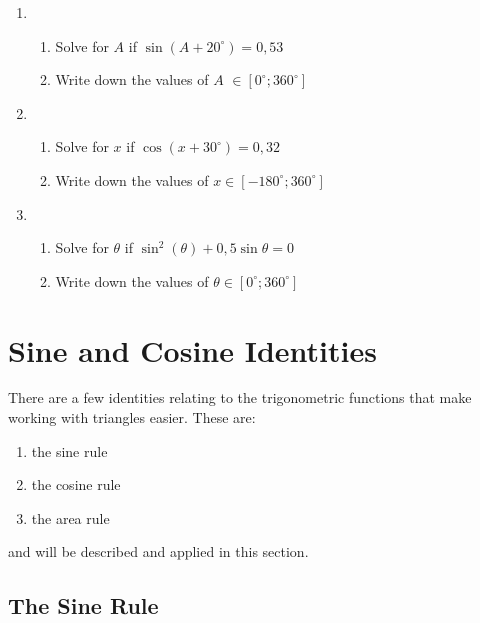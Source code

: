 {\begin{enumerate}
\begin{enumerate}
	\item Hence determine values of $\theta \in [0^\circ;720^\circ]$.
	\end{enumerate}
\item
	\begin{enumerate}
	\item Solve for $A$ if $\sin (A+20^\circ) = 0,53$
	\item Write down the values of $A$ $\in [0^\circ;360^\circ]$
	\end{enumerate}
\item
	\begin{enumerate}
	\item Solve for $x$ if $\cos (x+30^\circ) = 0,32$
	\item Write down the values of $x \in [-180^\circ;360^\circ]$
	\end{enumerate}
\item
	\begin{enumerate}
	\item Solve for $\theta$ if $\sin^2 (\theta) + 0,5\sin\theta = 0$
	\item Write down the values of $\theta \in [0^\circ;360^\circ]$
	\end{enumerate}
\end{enumerate}
}

\section{Sine and Cosine Identities}
There are a few identities relating to the trigonometric functions that make working with triangles easier. These are:
\begin{enumerate}
\item{the sine rule}
\item{the cosine rule}
\item{the area rule}
\end{enumerate}
and will be described and applied in this section.

\subsection{The Sine Rule}


